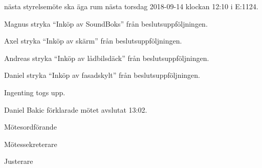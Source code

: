 \documentclass[10pt]{article}
\def\mo{Daniel Bakic}
\def\ms{Axel Voss}
\def\ji{Elin Johansson}
\begin{document}
\begin{paragrafer}
	\Mbaby

	\Mba nästa styrelsemöte ska äga rum nästa torsdag 2018-09-14 klockan 12:10 i E:1124.
		  
		
	Magnus \ypa stryka ``Inköp av SoundBoks'' från beslutsuppföljningen.
	
		
	Axel \ypa stryka ``Inköp av skärm'' från beslutsuppföljningen.
	

	Andreas \ypa stryka ``Inköp av lådbilsdäck'' från beslutsuppföljningen.
	 
	
	Daniel \ypa stryka ``Inköp av fasadskylt'' från beslutsuppföljningen.
	
	\Mbabay 
		
		
	Ingenting togs upp.
	
	{\mo} förklarade mötet avslutat 13:02.
\end{paragrafer}

\hidesignfoot
\begin{signatures}{3}
	\signature{\mo}{Mötesordförande}
	\signature{\ms}{Mötessekreterare}
	\signature{\ji}{Justerare}
\end{signatures}
\end{document}
